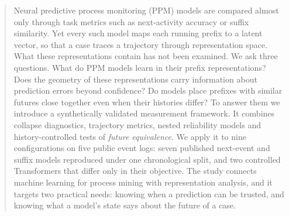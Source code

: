 \begin{abstract}
Neural predictive process monitoring (PPM) models are compared almost only
through task metrics such as next-activity accuracy or suffix similarity. Yet
every such model maps each running prefix to a latent vector, so that a case
traces a trajectory through representation space. What these representations
contain has not been examined. We ask three questions. What do PPM models
learn in their prefix representations? Does the geometry of these
representations carry information about prediction errors beyond confidence?
Do models place prefixes with similar futures close together even when their
histories differ? To answer them we introduce a synthetically validated
measurement framework. It combines collapse diagnostics, trajectory metrics,
nested reliability models and history-controlled tests of \emph{future
equivalence}. We apply it to nine configurations on five public event logs:
seven published next-event and suffix models reproduced under one
chronological split, and two controlled Transformers that differ only in
their objective. The study connects machine learning for process mining with
representation analysis, and it targets two practical needs: knowing when a
prediction can be trusted, and knowing what a model's state says about the
future of a case.
\end{abstract}
